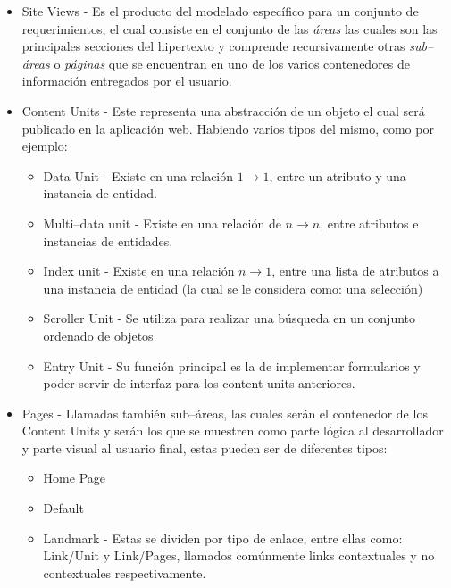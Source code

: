 \documentclass[oneside,12pt,a4paper]{memoir}%
\begin{document}
\begin{itemize}
	  \begin{itemize}
		\item Site Views - Es el producto del modelado espec\'ifico para un conjunto
		de requerimientos, el cual consiste en el conjunto de las \textit{\'areas}
		las cuales son las principales secciones del hipertexto y comprende
		recursivamente otras \textit{sub--\'areas} o \textit{p\'aginas} que se
		encuentran en uno de los varios contenedores de informaci\'on entregados por
		el usuario.
		\item Content Units - Este representa una abstracci\'on de un objeto el cual
		ser\'a publicado en la aplicaci\'on web. Habiendo varios tipos del mismo, como por
		ejemplo:
			  
		  \begin{itemize}
		    \item Data Unit - Existe en una relaci\'on $1 \to 1$, entre un atributo y
		    una instancia de entidad.
		    \item Multi--data unit - Existe en una relaci\'on de $n \to n$, entre
		    atributos e instancias de entidades.
		    \item Index unit - Existe en una
		    relaci\'on $ n \to 1$, entre una lista de atributos a una instancia de
		    entidad (la cual se le considera como: una selecci\'on)
		    \item Scroller Unit - Se utiliza para realizar una b\'usqueda en un
		    conjunto ordenado de objetos
		    \item Entry Unit - Su funci\'on principal es la de implementar
		    formularios y poder servir de interfaz para los content units anteriores.
		  \end{itemize}
			  

		\item Pages - Llamadas tambi\'en sub--\'areas, las cuales ser\'an el
		contenedor de los Content Units y ser\'an los que se muestren como parte
		l\'ogica al desarrollador y parte visual al usuario final, estas pueden ser de diferentes
		tipos:

		  \begin{itemize}
		    \item Home Page
		    \item Default
		    \item Landmark - Estas se dividen por tipo de enlace, entre ellas como:
		    Link/Unit y Link/Pages, llamados com\'unmente links contextuales y no
		    contextuales respectivamente.
		  \end{itemize}
	  \end{itemize}
			

\end{itemize}
\end{document}
